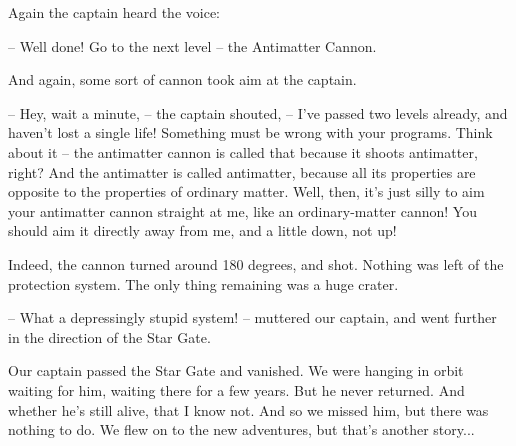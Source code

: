 \documentclass[ebook,twoside,final,openright]{memoir}
\begin{document}
\par
Again the captain heard the voice:\par
– Well done! Go to the next level – the Antimatter Cannon.\par
And again, some sort of cannon took aim at the captain.\par
– Hey, wait a minute, – the captain shouted, – I’ve passed two levels already, and haven’t lost a single life! Something must be wrong with your programs. Think about it – the antimatter cannon is called that because it shoots antimatter, right? And the antimatter is called antimatter, because all its properties are opposite to the properties of ordinary matter. Well, then, it’s just silly to aim your antimatter cannon straight at me, like an ordinary-matter cannon! You should aim it directly away from me, and a little down, not up!\par
\par
Indeed, the cannon turned around 180 degrees, and shot. Nothing was left of the protection system. The only thing remaining was a huge crater.\par
– What a depressingly stupid system! – muttered our captain, and went further in the direction of the Star Gate.\par
\par
Our captain passed the Star Gate and vanished. We were hanging in orbit waiting for him, waiting there for a few years. But he never returned. And whether he’s still alive, that I know not. And so we missed him, but there was nothing to do. We flew on to the new adventures, but that's another story...
\end{document}
